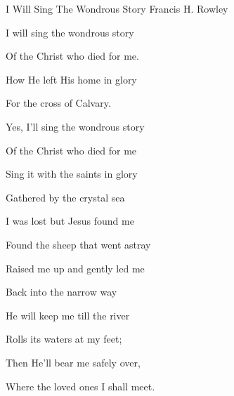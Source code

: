 \documentclass[12pt]{book}
\begin{document}
\begin{song}{I Will Sing The Wondrous Story}{}
  {\SBPubDom}
  {Francis H. Rowley}
  {}
  {}

  \begin{SBVerse}
    I will sing the wondrous story

    Of the Christ who died for me.

    How He left His home in glory

    For the cross of Calvary.
  \end{SBVerse}

  \begin{SBOpGroup}
    Yes, I'll sing the wondrous story

    Of the Christ who died for me

    Sing it with the saints in glory

    Gathered by the crystal sea
  \end{SBOpGroup}

  \begin{SBVerse}
    I was lost but Jesus found me

    Found the sheep that went astray

    Raised me up and gently led me

    Back into the narrow way
  \end{SBVerse}

  \begin{SBVerse}
    He will keep me till the river

    Rolls its waters at my feet;

    Then He'll bear me safely over,

    Where the loved ones I shall meet.
  \end{SBVerse}
\end{song}
\end{document}
